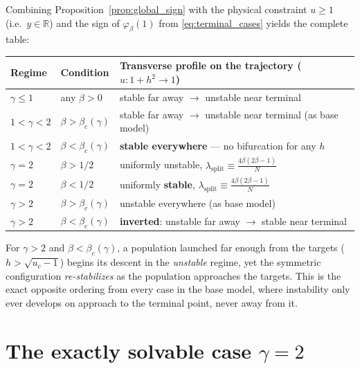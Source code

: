 \documentclass[11pt,a4paper]{article}
\theoremstyle{plain}
\theoremstyle{definition}
\theoremstyle{remark}
\newcommand{\R}{\mathbb{R}}
\newcommand{\lsplit}{\lambda_{\mathrm{split}}}
\newcommand{\bw}{\beta}
\newcommand{\phib}{\varphi_{\bw}}
\newcommand{\bwc}{\beta_c}
\begin{document}
Combining Proposition~\ref{prop:global_sign} with the physical constraint
$u\ge1$ (i.e.\ $y\in\R$) and the sign of $\phib(1)$ from
\eqref{eq:terminal_cases} yields the complete table:

\begin{center}
\renewcommand{\arraystretch}{1.35}
\begin{tabular}{@{}lll@{}}
\toprule
\textbf{Regime} & \textbf{Condition} & \textbf{Transverse profile on the trajectory ($u:1{+}h^2\to1$)}\\
\midrule
$\gamma\le1$ & any $\bw>0$ & stable far away $\to$ unstable near terminal\\
$1<\gamma<2$ & $\bw>\bwc(\gamma)$ & stable far away $\to$ unstable near terminal (as base model)\\
$1<\gamma<2$ & $\bw<\bwc(\gamma)$ & \textbf{stable everywhere} — no bifurcation for any $h$\\
$\gamma=2$   & $\bw>1/2$ & uniformly unstable, $\lsplit\equiv\frac{4\bw(2\bw-1)}{N}$\\
$\gamma=2$   & $\bw<1/2$ & uniformly \textbf{stable}, $\lsplit\equiv\frac{4\bw(2\bw-1)}{N}$\\
$\gamma>2$   & $\bw>\bwc(\gamma)$ & unstable everywhere (as base model)\\
$\gamma>2$   & $\bw<\bwc(\gamma)$ & \textbf{inverted}: unstable far away $\to$ stable near terminal\\
\bottomrule
\end{tabular}
\end{center}

\begin{warningbox}
For $\gamma>2$ and $\bw<\bwc(\gamma)$, a population launched far enough from
the targets ($h>\sqrt{u_c-1}$) begins its descent in the \emph{unstable}
regime, yet the symmetric configuration \emph{re-stabilizes} as the
population approaches the targets. This is the exact opposite ordering from
every case in the base model, where instability only ever develops on
approach to the terminal point, never away from it.
\end{warningbox}

\section{The exactly solvable case $\gamma=2$}
\label{sec:gamma2}
\end{document}
